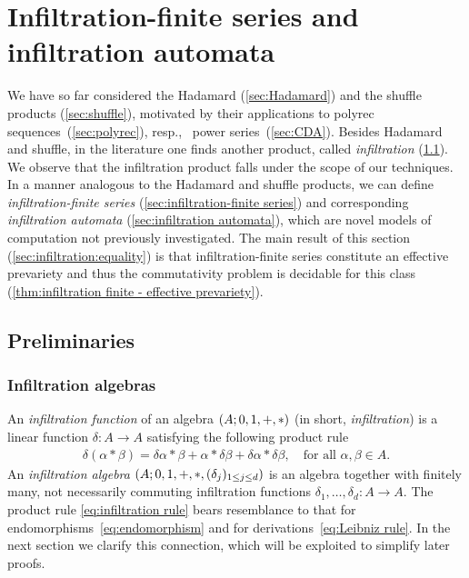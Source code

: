 \section{Infiltration-finite series and infiltration automata}
\label{sec:infiltration}

We have so far considered the Hadamard (\cref{sec:Hadamard}) and the shuffle products (\cref{sec:shuffle}),
motivated by their applications to polyrec sequences~(\cref{sec:polyrec}),
resp., \CDA~power series~(\cref{sec:CDA}).
%
Besides Hadamard and shuffle, in the literature one finds another product,
called \emph{infiltration} (\cref{sec:infiltration:preliminaries}).
%
We observe that the infiltration product falls under the scope of our techniques.
%
In a manner analogous to the Hadamard and shuffle products,
we can define \emph{infiltration-finite series} (\cref{sec:infiltration-finite series})
and corresponding \emph{infiltration automata} (\cref{sec:infiltration automata}),
which are novel models of computation not previously investigated.
%
The main result of this section (\cref{sec:infiltration:equality}) is that
infiltration-finite series constitute an effective prevariety
and thus the commutativity problem is decidable for this class
(\cref{thm:infiltration finite - effective prevariety}).

\subsection{Preliminaries}
\label{sec:infiltration:preliminaries}
\subsubsection{Infiltration algebras}

An \emph{infiltration function} of an algebra $(A; 0, 1, {+}, {*})$ (in short, \emph{infiltration})
is a linear function $\delta : A \to A$ satisfying the following product rule
%
\begin{align}
    \label{eq:infiltration rule}
    \tag{infiltration rule}
    \delta(\alpha * \beta) = \delta \alpha * \beta + \alpha * \delta \beta + \delta \alpha * \delta \beta,
    \quad\text{for all } \alpha, \beta \in A.
\end{align}
%
An \emph{infiltration algebra}
$(A; 0, 1, {+}, {*}, (\delta_j)_{1\leq j\leq d})$ is an algebra
together with finitely many, not necessarily commuting infiltration functions $\delta_1, \dots, \delta_d : A \to A$.
%
The product rule \cref{eq:infiltration rule} bears resemblance to that for
endomorphisms~\cref{eq:endomorphism} and for derivations~\cref{eq:Leibniz rule}.
%
In the next section we clarify this connection,
which will be exploited to simplify later proofs.

